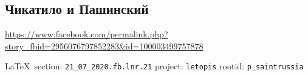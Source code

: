  
 

\subsection{Чикатило и Пашинский}
\url{https://www.facebook.com/permalink.php?story_fbid=2956076797852283&id=100003499757878}
  
\vspace{0.5cm}
{\small\LaTeX~section: \verb|21_07_2020.fb.lnr.21| project: \verb|letopis| rootid: \verb|p_saintrussia|}

\begin{figure}[ht]
 \centering
 \caption{}
 \label{fig:}
\end{figure}
\vspace{0.5cm}
  
